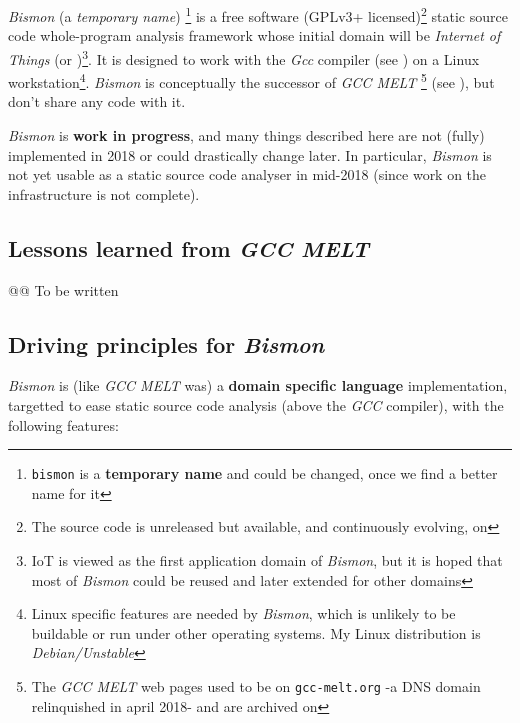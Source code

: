\textit{Bismon} (a \emph{temporary name}) \footnote{\texttt{bismon} is
  a \textbf{temporary name} and could be changed, once we find a
  better name for it} is a free software (GPLv3+
licensed)\footnote{The source code is unreleased but available, and
  continuously evolving, on
  } static source code
whole-program analysis framework whose initial domain will be
\emph{Internet of Things} (or )\footnote{IoT is viewed
  as the first application domain of \textit{Bismon}, but it is hoped
  that most of \textit{Bismon} could be reused and later extended for
  other domains}. It is designed to work with the \textit{Gcc}
compiler (see ) on a Linux
workstation\footnote{Linux specific features are needed by
  \textit{Bismon}, which is unlikely to be buildable or run under
  other operating systems. My Linux distribution is
  \emph{Debian/Unstable}}. \textit{Bismon} is conceptually the
successor of \textit{GCC MELT} \footnote{The \textit{GCC MELT} web
  pages used to be on \texttt{gcc-melt.org} -a DNS domain relinquished
  in april 2018- and are archived on
  } (see
\cite{Starynkevitch2007Multistage, starynkevitch-DSL2011}), but don't
share any code with it.

{\large \textit{Bismon} is \textbf{work in progress}}, and many things
described here are not (fully) implemented in 2018 or
could drastically change later. In particular, \textit{Bismon} is not
yet usable as a static source code analyser in mid-2018 (since work on
the infrastructure is not complete).

\bigskip

\subsection{Lessons learned from \textit{GCC MELT}}

@@ To be written

\medskip

\subsection{Driving principles for  \textit{Bismon}}

\textit{Bismon} is (like \textit{GCC MELT} was) a \textbf{domain
  specific language} implementation, targetted to ease static source
code analysis (above the \textit{GCC} compiler), with the following
features:

